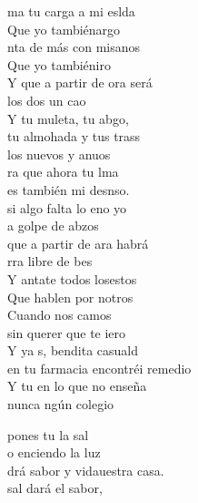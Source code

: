 \begin{cancion}%
	ma tu carga a mi eslda\\
	Que yo tambiénargo\\
	nta de más con misanos\\
	Que yo tambiéniro\\
	Y  que a partir de ora será\\
	 los dos un cao\\
	Y tu muleta, tu abgo,\\
	tu almohada y tus trass\\
	los nuevos y anuos\\
	\jump
	ra que ahora tu lma\\
	es también mi desnso.\\
	 si algo falta lo eno yo\\
	a golpe de abzos\\
	que a partir de ara habrá\\
	rra libre de bes \\
	Y antate todos losestos\\
	Que hablen por notros\\
	Cuando nos camos\\
	\jump
	 sin querer que te iero\\
	Y ya s, bendita casuald\\
	 en tu farmacia encontréi remedio\\
	Y tu en  lo que no enseña \\
	nunca ngún colegio\jump\\
	\begin{chorus}%
		 pones tu la sal \\
		o enciendo la luz\\
		drá sabor y vidauestra casa.\\
		 sal dará el sabor, \\

\end{chorus}
\end{cancion}
